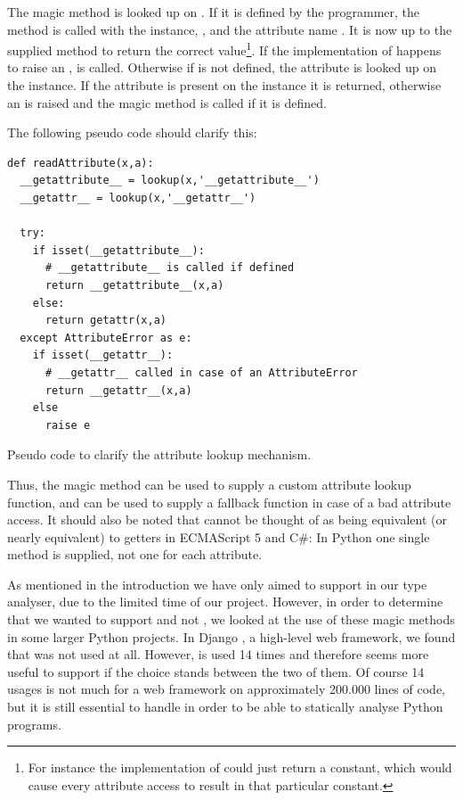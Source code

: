 The magic method  is looked up on . If it is defined by the programmer, the method is called with the instance, , and the attribute name . It is now up to the supplied method to return the correct value\footnote{For instance the implementation of  could just return a constant, which would cause every attribute access to result in that particular constant.}. If the implementation of  happens to raise an ,  is called. Otherwise if  is not defined, the attribute is looked up on the instance. If the attribute is present on the instance it is returned, otherwise an  is raised and the magic method  is called if it is defined.

The following pseudo code should clarify this:

\begin{listing}[H]
  \begin{verbatim}
def readAttribute(x,a):
  __getattribute__ = lookup(x,'__getattribute__')
  __getattr__ = lookup(x,'__getattr__')

  try:
    if isset(__getattribute__):
      # __getattribute__ is called if defined
      return __getattribute__(x,a)
    else:
      return getattr(x,a)
  except AttributeError as e:
    if isset(__getattr__):
      # __getattr__ called in case of an AttributeError
      return __getattr__(x,a)
    else
      raise e
  \end{verbatim}
  \caption{Pseudo code to clarify the attribute lookup mechanism.}
\end{listing}

Thus, the magic method  can be used to supply a custom attribute lookup function, and  can be used to supply a fallback function in case of a bad attribute access. It should also be noted that  cannot be thought of as being equivalent (or nearly equivalent) to getters in ECMAScript 5 and C\#: In Python one single method is supplied, not one for each attribute.

As mentioned in the introduction we have only aimed to support  in our type analyser, due to the limited time of our project. However, in order to determine that we wanted to support  and not , we looked at the use of these magic methods in some larger Python projects. In Django \cite{django}, a high-level web framework, we found that  was not used at all. However,  is used 14 times and therefore seems more useful to support if the choice stands between the two of them. Of course 14 usages is not much for a web framework on approximately 200.000 lines of code, but it is still essential to handle in order to be able to statically analyse Python programs.

